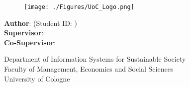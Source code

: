 \makeatletter
\begin{titlepage}
    \begin{center}
        \vspace*{1cm}

        \Large
        \textbf{\@title}

        \vspace{1.5cm}

        \thesistype{}

        \vspace{1cm}

        \begin{figure}[htbp]
             \centering
             \texttt{[image: ./Figures/UoC\_Logo.png]}
        \end{figure}

        \vspace{1cm}

        \large
        \textbf{Author}: \thesisauthor{} (Student ID: \studentID{})\\
        \large
        \textbf{Supervisor}: \supervisor{}\\
        \large
        \textbf{Co-Supervisor}: \cosupervisor{}

        \vspace{1cm}
        \large
        Department of Information Systems for Sustainable Society\\
        Faculty of Management, Economics and Social Sciences\\
        University of Cologne\\

        \vspace{1cm}
        \@date

    \end{center}
\end{titlepage}
\makeatother
